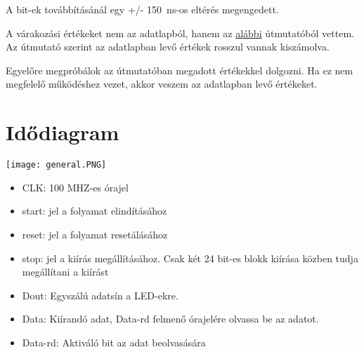 \documentclass[10pt]{article} %
\begin{document}
\noindent A bit-ek továbbításánál egy +/- \SI{150}{\nano\second}-os eltérés megengedett.

A várakozási értékeket nem az adatlapból, hanem az \href{https://learn.adafruit.com/adafruit-neopixel-uberguide}{alábbi} útmutatóból vettem. Az útmutató szerint az adatlapban levő értékek rosszul vannak kiszámolva.

Egyelőre megpróbálok az útmutatóban megadott értékekkel dolgozni. Ha ez nem megfelelő működéshez vezet, akkor veszem az adatlapban levő értékeket.

\section{Idődiagram}

\texttt{[image: general.PNG]}

\begin{itemize}
\item CLK: 100 MHZ-es órajel
\item start: jel a folyamat elindításához
\item reset: jel a folyamat resetálásához
\item stop: jel a kiírás megállításához. Csak két 24 bit-es blokk kiírása közben tudja megállítani a kiírást
\item Dout: Egyszálú adatsín a LED-ekre.
\item Data: Kiírandó adat, Data-rd felmenő órajelére olvassa be az adatot.
\item Data-rd: Aktiváló bit az adat beolvasására
\end{itemize}
\end{document}
